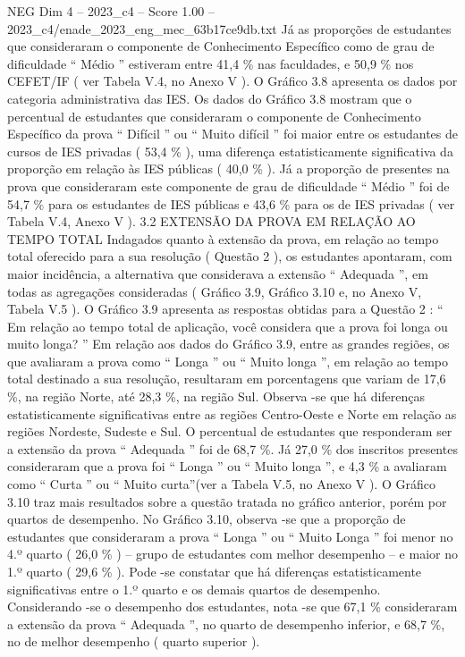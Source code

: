 \begin{textsample}{NEG Dim 4 – 2023\_c4 – Score 1.00 – 2023\_c4/enade\_2023\_eng\_mec\_63b17ce9db.txt}
Já as proporções de estudantes que consideraram o componente de Conhecimento Específico como de grau de dificuldade “ Médio ” estiveram entre 41,4 \% nas faculdades, e 50,9 \% nos CEFET/IF ( ver Tabela V.4, no Anexo V ).
O Gráfico 3.8 apresenta os dados por categoria administrativa das IES.
Os dados do Gráfico 3.8 mostram que o percentual de estudantes que consideraram o componente de Conhecimento Específico da prova “ Difícil ” ou “ Muito difícil ” foi maior entre os estudantes de cursos de IES privadas ( 53,4 \% ), uma diferença estatisticamente significativa da proporção em relação às IES públicas ( 40,0 \% ).
Já a proporção de presentes na prova que consideraram este componente de grau de dificuldade “ Médio ” foi de 54,7 \% para os estudantes de IES públicas e 43,6 \% para os de IES privadas ( ver Tabela V.4, Anexo V ). 3.2 EXTENSÃO DA PROVA EM RELAÇÃO AO TEMPO TOTAL Indagados quanto à extensão da prova, em relação ao tempo total oferecido para a sua resolução ( Questão 2 ), os estudantes apontaram, com maior incidência, a alternativa que considerava a extensão “ Adequada ”, em todas as agregações consideradas ( Gráfico 3.9, Gráfico 3.10 e, no Anexo V, Tabela V.5 ).
O Gráfico 3.9 apresenta as respostas obtidas para a Questão 2 : “ Em relação ao tempo total de aplicação, você considera que a prova foi longa ou muito longa? ” Em relação aos dados do Gráfico 3.9, entre as grandes regiões, os que avaliaram a prova como “ Longa ” ou “ Muito longa ”, em relação ao tempo total destinado a sua resolução, resultaram em porcentagens que variam de 17,6 \%, na região Norte, até 28,3 \%, na região Sul.
Observa -se que há diferenças estatisticamente significativas entre as regiões Centro-Oeste e Norte em relação as regiões Nordeste, Sudeste e Sul.
O percentual de estudantes que responderam ser a extensão da prova “ Adequada ” foi de 68,7 \%.
Já 27,0 \% dos inscritos presentes consideraram que a prova foi “ Longa ” ou “ Muito longa ”, e 4,3 \% a avaliaram como “ Curta ” ou “ Muito curta”(ver a Tabela V.5, no Anexo V ).
O Gráfico 3.10 traz mais resultados sobre a questão tratada no gráfico anterior, porém por quartos de desempenho.
No Gráfico 3.10, observa -se que a proporção de estudantes que consideraram a prova “ Longa ” ou “ Muito Longa ” foi menor no 4.º quarto ( 26,0 \% ) – grupo de estudantes com melhor desempenho – e maior no 1.º quarto ( 29,6 \% ).
Pode -se constatar que há diferenças estatisticamente significativas entre o 1.º quarto e os demais quartos de desempenho.
Considerando -se o desempenho dos estudantes, nota -se que 67,1 \% consideraram a extensão da prova “ Adequada ”, no quarto de desempenho inferior, e 68,7 \%, no de melhor desempenho ( quarto superior ).

\end{textsample}
